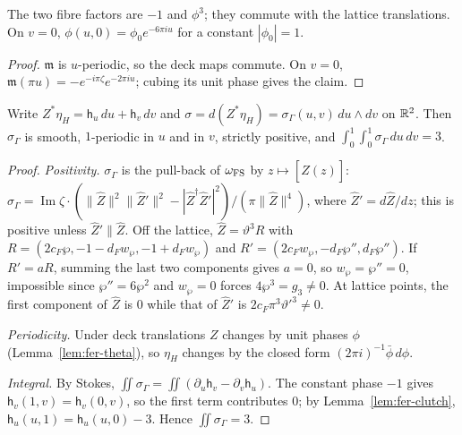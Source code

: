 \begin{lemma}\label{lem:fer-clutch}
The two fibre factors are $-1$ and $\phi^3$; they commute with the lattice translations. On $v=0$,
$\phi(u,0)=\phi_0e^{-6\pi iu}$ for a constant $|\phi_0|=1$.
\end{lemma}

\begin{proof}
$\mathfrak m$ is $u$-periodic, so the deck maps commute. On $v=0$, $\mathfrak m(\pi u)=-e^{-i\pi\zeta}e^{-2\pi iu}$; cubing its unit phase gives the claim.
\end{proof}

\begin{lemma}\label{lem:fer-sigma}
Write $Z^*\eta_H=\mathsf h_u\,du+\mathsf h_v\,dv$ and $\sigma=d(Z^*\eta_H)=\sigma_\Gamma(u,v)\,du\wedge dv$ on $\mathbb{R}^2$. Then
$\sigma_\Gamma$ is smooth, $1$-periodic in $u$ and in $v$, strictly positive, and
$\int_0^1\!\int_0^1\sigma_\Gamma\,du\,dv=3$.
\end{lemma}

\begin{proof}
\emph{Positivity.} $\sigma_\Gamma$ is the pull-back of $\omega_{\rm FS}$ by $z\mapsto[\hat Z(z)]$:
$\sigma_\Gamma=\operatorname{Im}\zeta\cdot(\|\hat Z\|^2\|\hat Z'\|^2-|\hat Z^\dagger \hat Z'|^2)/(\pi\|\hat Z\|^4)$, where $\hat Z'=d\hat Z/dz$; this is positive unless $\hat Z'\parallel\hat Z$. Off the lattice, $\hat Z=\vartheta^3R$ with $R=(2c_F\wp,-1-d_Fw_\wp,-1+d_Fw_\wp)$ and $R'=(2c_Fw_\wp,-d_F\wp'',d_F\wp'')$. If $R'=aR$, summing the last two components gives $a=0$, so $w_\wp=\wp''=0$, impossible since $\wp''=6\wp^2$ and $w_\wp=0$ forces $4\wp^3=g_3\ne0$. At lattice points, the first component of $\hat Z$ is $0$ while that of $\hat Z'$ is $2c_F\pi^3\vartheta'^3\ne0$.

\emph{Periodicity.} Under deck translations $Z$ changes by unit phases $\phi$ (Lemma~\ref{lem:fer-theta}), so $\eta_H$ changes by the closed form $(2\pi i)^{-1}\bar\phi\,d\phi$.

\emph{Integral.} By Stokes, $\iint\sigma_\Gamma=\iint(\partial_u\mathsf h_v-\partial_v\mathsf h_u)$. The constant phase $-1$ gives $\mathsf h_v(1,v)=\mathsf h_v(0,v)$, so the first term contributes $0$; by Lemma~\ref{lem:fer-clutch}, $\mathsf h_u(u,1)=\mathsf h_u(u,0)-3$. Hence $\iint\sigma_\Gamma=3$.
\end{proof}

